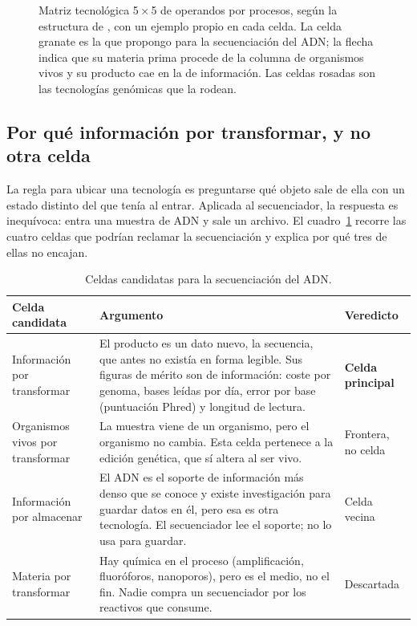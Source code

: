\documentclass[11pt,letterpaper]{article}
\begin{document}
\begin{figure}[htbp]
\caption{Matriz tecnológica 5\,×\,5 de operandos por procesos, según la
estructura de \textcite{deweck2022}, con un ejemplo propio en cada celda. La
celda granate es la que propongo para la secuenciación del ADN; la flecha
indica que su materia prima procede de la columna de organismos vivos y su
producto cae en la de información. Las celdas rosadas son las tecnologías
genómicas que la rodean.}
\label{fig:matriz}
\end{figure}

\subsection*{Por qué información por transformar, y no otra celda}

La regla para ubicar una tecnología es preguntarse qué objeto sale de ella con
un estado distinto del que tenía al entrar. Aplicada al secuenciador, la
respuesta es inequívoca: entra una muestra de ADN y sale un archivo. El
cuadro~\ref{tab:celdas} recorre las cuatro celdas que podrían reclamar la
secuenciación y explica por qué tres de ellas no encajan.

\begin{table}[htbp]
\centering
\small
\renewcommand{\arraystretch}{1.25}
\begin{tabularx}{\textwidth}{@{}p{3.6cm}X p{1.9cm}@{}}
\toprule
\textbf{Celda candidata} & \textbf{Argumento} & \textbf{Veredicto} \\
\midrule
Información por transformar &
  El producto es un dato nuevo, la secuencia, que antes no existía en forma
  legible. Sus figuras de mérito son de información: coste por genoma, bases
  leídas por día, error por base (puntuación Phred) y longitud de lectura. &
  \textbf{Celda principal} \\
Organismos vivos por transformar &
  La muestra viene de un organismo, pero el organismo no cambia. Esta celda
  pertenece a la edición genética, que sí altera al ser vivo. &
  Frontera, no celda \\
Información por almacenar &
  El ADN es el soporte de información más denso que se conoce y existe
  investigación para guardar datos en él, pero esa es otra tecnología. El
  secuenciador lee el soporte; no lo usa para guardar. &
  Celda vecina \\
Materia por transformar &
  Hay química en el proceso (amplificación, fluoróforos, nanoporos), pero es
  el medio, no el fin. Nadie compra un secuenciador por los reactivos que
  consume. &
  Descartada \\
\bottomrule
\end{tabularx}
\caption{Celdas candidatas para la secuenciación del ADN.}
\label{tab:celdas}
\end{table}
\end{document}
